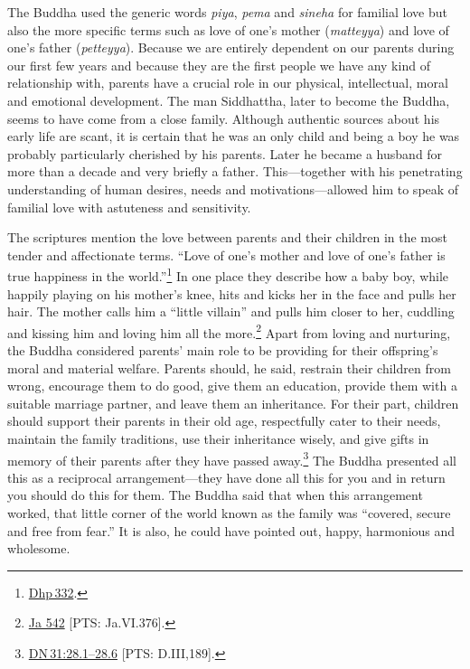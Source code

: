 \documentclass[10pt, openright]{book}
\begin{document}
The Buddha used the generic words \textit{piya}, \textit{pema} and \textit{sineha} for familial love but also the more specific terms such as love of one’s mother (\textit{matteyya}) and love of one’s father (\textit{petteyya}). Because we are entirely dependent on our parents during our first few years and because they are the first people we have any kind of relationship with, parents have a crucial role in our physical, intellectual, moral and emotional development. The man Siddhattha, later to become the Buddha, seems to have come from a close family. Although authentic sources about his early life are scant, it is certain that he was an only child and being a boy he was probably particularly cherished by his parents. Later he became a husband for more than a decade and very briefly a father. This—together with his penetrating understanding of human desires, needs and motivations—allowed him to speak of familial love with astuteness and sensitivity.


The scriptures mention the love between parents and their children in the most tender and affectionate terms. “Love of one’s mother and love of one’s father is true happiness in the world.”\footnote {\href{https://suttacentral.net/dhp332/en/sujato}{Dhp 332}.} In one place they describe how a baby boy, while happily playing on his mother’s knee, hits and kicks her in the face and pulls her hair. The mother calls him a “little villain” and pulls him closer to her, cuddling and kissing him and loving him all the more.\footnote {\href{https://suttacentral.net/ja542/en/cowell-rouse?reference=main/pts#pts-vp-pli376}{Ja 542} [PTS: Ja.VI.376].} Apart from loving and nurturing, the Buddha considered parents’ main role to be providing for their offspring’s moral and material welfare. Parents should, he said, restrain their children from wrong, encourage them to do good, give them an education, provide them with a suitable marriage partner, and leave them an inheritance. For their part, children should support their parents in their old age, respectfully cater to their needs, maintain the family traditions, use their inheritance wisely, and give gifts in memory of their parents after they have passed away.\footnote {\href{https://suttacentral.net/dn31/en/sujato\#28.1}{DN 31:28.1–28.6} [PTS: D.III,189].} The Buddha presented all this as a reciprocal arrangement—they have done all this for you and in return you should do this for them. The Buddha said that when this arrangement worked, that little corner of the world known as the family was “covered, secure and free from fear.” It is also, he could have pointed out, happy, harmonious and wholesome.
\end{document}
